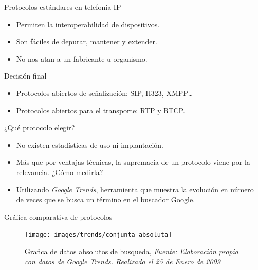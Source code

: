 \documentclass{beamer}
\begin{document}
\begin{frame}
  \begin{block}{Protocolos estándares en telefonía IP}
    \begin{itemize}
    \item Permiten la interoperabilidad de dispositivos.
    \item Son fáciles de depurar, mantener y extender.
    \item No nos atan a un fabricante u organismo.
    \end{itemize}
  \end{block}
\pause
  \begin{block}{Decisión final}
    \begin{itemize}
    \item Protocolos abiertos de señalización: SIP, H323, XMPP\ldots
    \item Protocolos abiertos para el transporte: RTP y RTCP.
    \end{itemize}
    
  \end{block}

\end{frame}

\begin{frame}
  \begin{block}{¿Qué protocolo elegir?}
    \begin{itemize}[<+->]
    \item No existen estadísticas de uso ni implantación.
    \item Más que por ventajas técnicas, la supremacía de un protocolo viene por la relevancia. ¿Cómo medirla?
    \item Utilizando \emph{Google Trends}, herramienta que muestra la evolución en número de veces que se busca un término en el buscador Google.
  \end{itemize}
  \end{block}
\end{frame}
 

\begin{frame}{Gráfica comparativa de protocolos}
\begin{figure}
  \centering
  \label{fig:absoluta}
  \texttt{[image: images/trends/conjunta\_absoluta]}
  \caption{Grafica de datos absolutos de busqueda, \emph{Fuente: Elaboración propia con datos de Google Trends. Realizado el 25 de Enero de 2009}}
\end{figure}
\end{frame}
\end{document}
